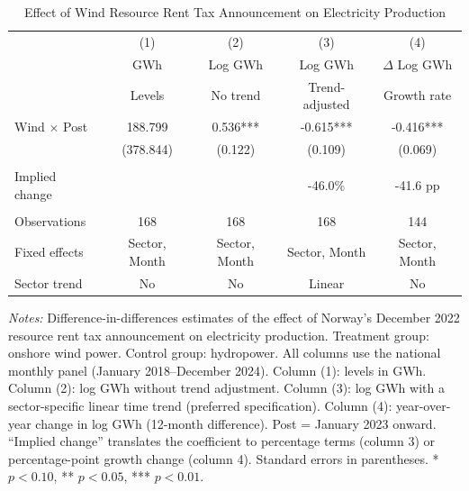 \begin{table}[H]
\centering
\caption{Effect of Wind Resource Rent Tax Announcement on Electricity Production}
\label{tab:main}
\begin{threeparttable}
\begin{tabular}{lcccc}
\toprule
 & (1) & (2) & (3) & (4) \\
 & GWh & Log GWh & Log GWh & $\Delta$ Log GWh \\
 & Levels & No trend & Trend-adjusted & Growth rate \\
\midrule
Wind $\times$ Post & 188.799 & 0.536*** & -0.615*** & -0.416*** \\
                    & (378.844) & (0.122) & (0.109) & (0.069) \\
 & & & & \\
Implied change & & & -46.0\% & -41.6 pp \\
 & & & & \\
Observations & 168 & 168 & 168 & 144 \\
Fixed effects & Sector, Month & Sector, Month & Sector, Month & Sector, Month \\
Sector trend & No & No & Linear & No \\
\bottomrule
\end{tabular}
\begin{tablenotes}[flushleft]
\small
\item \textit{Notes:} Difference-in-differences estimates of the effect of Norway's December 2022 resource rent tax announcement on electricity production. Treatment group: onshore wind power. Control group: hydropower. All columns use the national monthly panel (January 2018--December 2024). Column (1): levels in GWh. Column (2): log GWh without trend adjustment. Column (3): log GWh with a sector-specific linear time trend (preferred specification). Column (4): year-over-year change in log GWh (12-month difference). Post = January 2023 onward. ``Implied change'' translates the coefficient to percentage terms (column 3) or percentage-point growth change (column 4). Standard errors in parentheses. * $p<0.10$, ** $p<0.05$, *** $p<0.01$.
\end{tablenotes}
\end{threeparttable}
\end{table}

